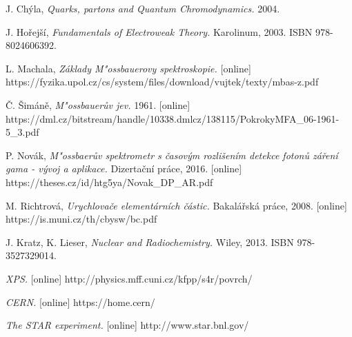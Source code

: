 \documentclass[12pt]{book}
\begin{document}
\begin{thebibliography}{1}
 J. Chýla, \textit{Quarks, partons and Quantum Chromodynamics.} 2004.

 J. Hořejší, \textit{Fundamentals of Electroweak Theory.} Karolinum, 2003. ISBN 978-8024606392.

 L. Machala, \textit{Základy M"ossbauerovy spektroskopie.} [online] \\https://fyzika.upol.cz/cs/system/files/download/vujtek/texty/mbas-z.pdf

 Č. Šimáně, \textit{M"ossbauerův jev.} 1961. [online] \\https://dml.cz/bitstream/handle/10338.dmlcz/138115/PokrokyMFA\_06-1961-5\_3.pdf

 P. Novák, \textit{M"ossbaerův spektrometr s časovým rozlišením detekce fotonů záření gama - vývoj a aplikace.} Dizertační práce, 2016. [online] https://theses.cz/id/htg5ya/Novak\_DP\_AR.pdf

 M. Richtrová, \textit{Urychlovače elementárních částic.} Bakalářská práce, 2008. [online] \\https://is.muni.cz/th/cbysw/bc.pdf

 J. Kratz, K. Lieser, \textit{Nuclear and Radiochemistry.} Wiley, 2013. ISBN 978-3527329014.


 \textit{XPS.} [online] http://physics.mff.cuni.cz/kfpp/s4r/povrch/

 \textit{CERN.} [online] https://home.cern/

 \textit{The STAR experiment.} [online] http://www.star.bnl.gov/

\end{thebibliography}
\end{document}
